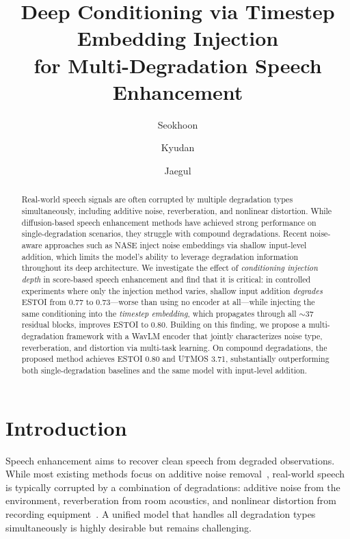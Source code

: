 \documentclass[cameraready]{Interspeech}
\title{Deep Conditioning via Timestep Embedding Injection\\for Multi-Degradation Speech Enhancement}
\author[affiliation={1}, orcid=0009-0002-3994-7018]{Seokhoon}{Moon}
\author[affiliation={2}, orcid=0009-0006-4946-6305]{Kyudan}{Jung}
\author[affiliation={2}, orcid=0000-0003-1071-4835, correspondingauthor]{Jaegul}{Choo}
\begin{document}
\maketitle

\begin{abstract}
Real-world speech signals are often corrupted by multiple degradation types simultaneously, including additive noise, reverberation, and nonlinear distortion.
While diffusion-based speech enhancement methods have achieved strong performance on single-degradation scenarios, they struggle with compound degradations.
Recent noise-aware approaches such as NASE inject noise embeddings via shallow input-level addition, which limits the model's ability to leverage degradation information throughout its deep architecture.
We investigate the effect of \textit{conditioning injection depth} in score-based speech enhancement and find that it is critical: in controlled experiments where only the injection method varies, shallow input addition \textit{degrades} ESTOI from 0.77 to 0.73---worse than using no encoder at all---while injecting the same conditioning into the \textit{timestep embedding}, which propagates through all ${\sim}37$ residual blocks, improves ESTOI to 0.80.
Building on this finding, we propose a multi-degradation framework with a WavLM encoder that jointly characterizes noise type, reverberation, and distortion via multi-task learning.
On compound degradations, the proposed method achieves ESTOI 0.80 and UTMOS 3.71, substantially outperforming both single-degradation baselines and the same model with input-level addition.
\end{abstract}


\section{Introduction}

Speech enhancement aims to recover clean speech from degraded observations.
While most existing methods focus on additive noise removal~\cite{fu2021metricgan, lu2023mpsenet, richter2023speech}, real-world speech is typically corrupted by a combination of degradations: additive noise from the environment, reverberation from room acoustics, and nonlinear distortion from recording equipment~\cite{su2020hifi, liu2022voicefixer}.
A unified model that handles all degradation types simultaneously is highly desirable but remains challenging.
\end{document}
